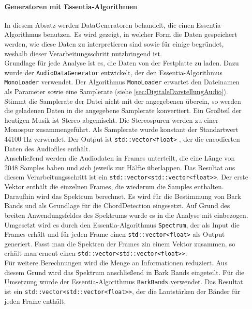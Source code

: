 \documentclass[11pt,a4paper]{article}
\begin{document}
\paragraph{Generatoren mit Essentia-Algorithmen}
In diesem Absatz werden DataGeneratoren behandelt, die einen Essentia-Algorithmus benutzen. Es wird gezeigt, in welcher Form die Daten gespeichert werden, wie diese Daten zu interpretieren sind sowie für einige begründet, weshalb dieser Verarbeitungsschritt nutzbringend ist.\\
Grundlage für jede Analyse ist es, die Daten von der Festplatte zu laden. Dazu wurde der \lstinline!AudioDataGenerator! entwickelt, der den Essentia-Algorithmus \lstinline!MonoLoader! verwendet. Der Algorithmus \lstinline!MonoLoader! erwartet den Dateinamen als Parameter sowie eine Samplerate (siehe \ref{sec:DigitaleDarstellungAudio}). Stimmt die Samplerate der Datei nicht mit der angegebenen überein, so werden die geladenen Daten in die angegebene Samplerate konvertiert. Ein Großteil der heutigen Musik ist Stereo abgemischt. Die Stereospuren werden zu einer Monospur zusammengeführt. Als Samplerate wurde konstant der Standartwert 44100 Hz verwendet. Der Output ist \lstinline!std::vector<float>! , der die encodierten Daten des Audiofiles enthält.\\
Anschließend werden die Audiodaten in Frames unterteilt, die eine Länge von 2048 Samples haben und sich jeweils zur Hälfte überlappen. Das Resultat aus diesem Verarbeitungsschritt ist ein \lstinline!std::vector<std::vector<float>>!. Der erste Vektor enthält die einzelnen Frames, die wiederum die Samples enthalten.\\
Daraufhin wird das Spektrum berechnet. Es wird für die Bestimmung von Bark Bands und als Grundlage für die ChordDetection eingesetzt. Auf Grund des breiten Anwendungsfeldes des Spektrums wurde es in die Analyse mit einbezogen. Umgesetzt wird es durch den Essentia-Algorithmus \lstinline!Spectrum!, der als Input die Frames erhält und für jeden Frame einen \lstinline!std::vector<float>! als Output generiert. Fasst man die Spektren der Frames zin einem Vektor zusammen, so erhält man erneut einen \lstinline!std::vector<std::vector<float>>!.\\
Für weitere Berechnungen wird die Menge an Informationen reduziert. Aus diesem Grund wird das Spektrum anschließend in Bark Bands eingeteilt. Für die Umsetzung wurde der Essentia-Algorithmus \lstinline!BarkBands! verwendet. Das Resultat ist ein \lstinline!std::vector<std::vector<float>>!, der die Lautstärken der Bänder für jeden Frame enthält.\\
\end{document}
